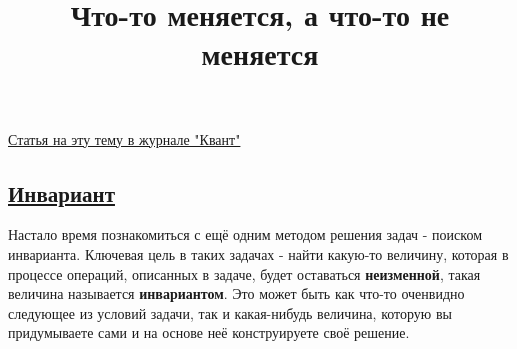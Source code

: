 \documentclass[a4paper,12pt]{article}
\title{Что-то меняется, а что-то не меняется}
\begin{document}
\maketitle
    \subsubsection*{}\href{https://kvant.mccme.ru/1976/02/poisk_invarianta.htm}{Статья на эту тему в журнале "Квант"}
    \subsection*{\underline{Инвариант}} Настало время познакомиться с ещё одним методом решения задач - поиском инварианта. Ключевая цель в таких задачах - найти какую-то величину, которая в процессе операций, описанных в задаче, будет оставаться \textbf{неизменной}, такая величина называется \textbf{инвариантом}. Это может быть как что-то оченвидно следующее из условий задачи, так и какая-нибудь величина, которую вы придумываете сами и на основе неё конструируете своё решение.
\end{document}
